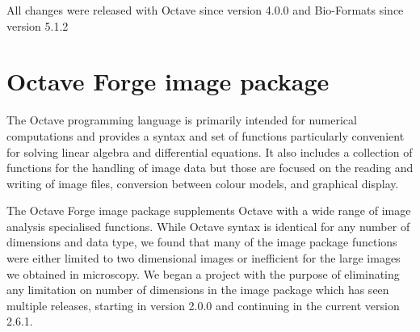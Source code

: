 All changes were released with Octave since version 4.0.0 and
Bio-Formats since version 5.1.2

\section{Octave Forge image package}

The Octave programming language is primarily intended for numerical
computations and provides a syntax and set of functions particularly
convenient for solving linear algebra and differential equations.  It
also includes a collection of functions for the handling of image data
but those are focused on the reading and writing of image files,
conversion between colour models, and graphical display.

The Octave Forge image package supplements Octave with a wide range of
image analysis specialised functions.  While Octave syntax is
identical for any number of dimensions and data type, we found that
many of the image package functions were either limited to two
dimensional images or inefficient for the large images we obtained in
microscopy.  We began a project with the purpose of eliminating any
limitation on number of dimensions in the image package
 which has seen multiple
releases, starting in version 2.0.0 and continuing in the current
version 2.6.1.

